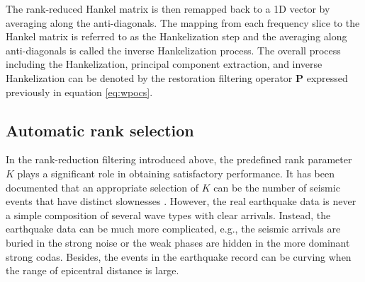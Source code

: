 The rank-reduced Hankel matrix is then remapped back to a 1D vector by averaging along the anti-diagonals. The mapping from each frequency slice to the Hankel matrix is referred to as the Hankelization step and the averaging along anti-diagonals is called the inverse Hankelization process. The overall process including the Hankelization, principal component extraction, and inverse Hankelization can be denoted by the restoration filtering operator $\mathbf{P}$ expressed previously in equation \ref{eq:wpocs}. 

\subsection*{Automatic rank selection} In the rank-reduction filtering introduced above, the predefined rank parameter $K$ plays a significant role in obtaining satisfactory performance. It has been documented that an appropriate selection of $K$ can be the number of seismic events that have distinct slownesses \cite{mssa}. However, the real earthquake data is never a simple composition of several wave types with clear arrivals. Instead, the earthquake data can be much more complicated, e.g., the seismic arrivals are buried  in the strong noise or the weak phases are hidden in the more dominant strong codas. Besides, the events in the earthquake record can be curving when the range of epicentral distance is large. 


